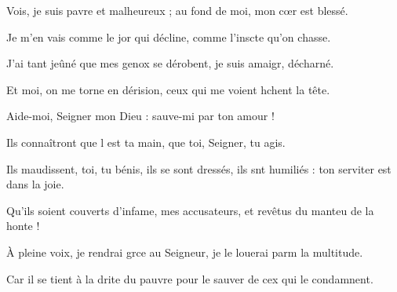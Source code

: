 \item Vois, je suis pavre et malheureux ;\psstar{} au fond de moi, mon cœr est blessé.
\item Je m'en vais comme le jor qui décline,\psstar{} comme l'inscte qu'on chasse.
\item J'ai tant jeûné que mes genox se dérobent,\psstar{} je suis amaigr, décharné.
\item Et moi, on me torne en dérision,\psstar{} ceux qui me voient hchent la tête.
\item Aide-moi, Seigner mon Dieu :\psstar{} sauve-mi par ton amour !
\item Ils connaîtront que l est ta main,\psstar{} que toi, Seigner, tu agis.
\item Ils maudissent, toi, tu bénis,\pscross{} ils se sont dressés, ils snt humiliés :\psstar{} ton serviter est dans la joie.
\item Qu'ils soient couverts d'infame, mes accusateurs,\psstar{} et revêtus du manteu de la honte !
\item À pleine voix, je rendrai grce au Seigneur,\psstar{} je le louerai parm la multitude.
\item Car il se tient à la drite du pauvre\psstar{} pour le sauver de cex qui le condamnent.